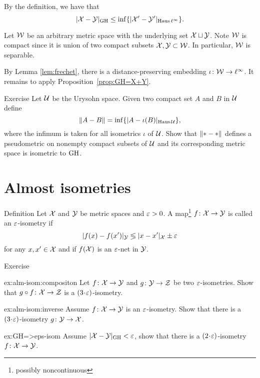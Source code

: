 By the definition, we have that 
\[|\mathcal{X}-\mathcal{Y}|_{\operatorname{\rm GH}\nolimits} \leq \inf \{|\mathcal{X}'-\mathcal{Y}'|_{\operatorname{\rm Haus}\nolimits\ell^\infty}\}.\]

Let $\mathcal{W}$ be an arbitrary metric space with the underlying set $\mathcal{X}\sqcup \mathcal{Y}$.
Note $\mathcal{W}$ is compact since it is union of two compact subsets $\mathcal{X},\mathcal{Y}\subset \mathcal{W}$.
In particular, $\mathcal{W}$ is separable.

By Lemma \ref{lem:frechet}, there is a distance-preserving embedding $\iota\:\spc{W}\z\to \ell^\infty$.
It remains to apply Proposition~\ref{prop:GH=X+Y}.
\qeds

\begin{thm}{Exercise}
Let $\mathcal{U}$ be the Urysohn space.
Given two compact set $A$ and $B$ in $\mathcal{U}$ define 
\[\|A-B\|=\inf\{|A-\iota(B)|_{\operatorname{\rm Haus}\nolimits\mathcal{U}}\},\]
where the infimum is taken for all isometrics $\iota$ of $\mathcal{U}$.
Show that $\|{*}\z-{*}\|$ defines a pseudometric on nonempty compact subsets of $\mathcal{U}$ and its corresponding metric space is isometric to $\operatorname{\rm GH}\nolimits$.
\end{thm}



\section{Almost isometries}\label{sec:alm-isom}

\begin{thm}{Definition} Let $\mathcal{X}$ and $\mathcal{Y}$ be metric spaces and $\varepsilon > 0$. 
A  map\footnote{possibly noncontinuous} $f\: \spc{X} \z\to \spc{Y}$ is called an $\varepsilon$-isometry 
if 
$$|f(x)-f(x')|_{\mathcal{Y}}\lessgtr |x-x'|_{\mathcal{X}}\pm\varepsilon$$
for any $x,x'\in \mathcal{X}$ 
and if $f(\mathcal{X})$ is an $\varepsilon$-net in $\mathcal{Y}$.
\end{thm}

\begin{thm}{Exercise}\label{ex:alm-isom}

\begin{subthm}{ex:alm-isom:compositon}
Let $f\colon\mathcal{X}\to \mathcal{Y}$ and $g\colon\mathcal{Y}\to \mathcal{Z}$ be two $\varepsilon$-isometries.
Show that $g\circ f\colon \mathcal{X}\to \mathcal{Z}$ is a $(3\cdot\eps)$-isometry.
\end{subthm}

\begin{subthm}{ex:alm-isom:inverse}
Assume $f\: \spc{X} \z\to \spc{Y}$ is an $\varepsilon$-isometry.
Show that there is a $(3\cdot\eps)$-isometry 
$g\colon \mathcal{Y}\to \mathcal{X}$.
\end{subthm}

\begin{subthm}{ex:GH=>eps-isom}
 Assume $|\mathcal{X}-\mathcal{Y}|_{\operatorname{\rm GH}\nolimits}<\varepsilon$, show that there is a $(2\cdot\eps)$-isometry 
$f\colon \mathcal{X}\to \mathcal{Y}$.
\end{subthm}
\end{thm}

